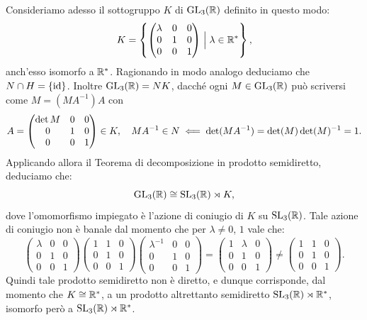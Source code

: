 \documentclass[11pt]{scrartcl}
\begin{document}
	Consideriamo adesso il sottogruppo $K$ di $\operatorname{GL}_3(\mathbb R)$ definito in questo modo:
	\[
	K = \left\{\begin{pmatrix}
		\lambda & 0 & 0\\
		0 & 1 & 0\\
		0 & 0 & 1
	\end{pmatrix}\Bigm| \lambda \in \mathbb R^* \right\},
	\]
	anch'esso isomorfo a $\mathbb R^*$. Ragionando in modo analogo deduciamo che $N \cap H = \{\mathrm{id}\}$. 
	Inoltre $\operatorname{GL}_3(\mathbb R) = NK$, dacché ogni $M \in \operatorname{GL}_3(\mathbb R)$ può scriversi come
	$M = (MA^{-1})A$ con 
	\[
	A = \begin{pmatrix}
		\det M & 0 & 0\\
		0 & 1 & 0\\
		0 & 0 & 1
	\end{pmatrix} \in K, \quad MA^{-1} \in N \impliedby \det(MA^{-1}) = \det(M) \det(M)^{-1} = 1.
	\]
	Applicando allora il Teorema di decomposizione in prodotto semidiretto, deduciamo
	che: 
	\[
	\operatorname{GL}_3(\mathbb R) \cong \operatorname{SL}_3(\mathbb R) \rtimes K,
	\]
	dove l'omomorfismo impiegato è l'azione di coniugio di $K$ su $\operatorname{SL}_3(\mathbb R)$.
	Tale azione di coniugio non è banale dal momento che per $\lambda \neq 0$, $1$ vale che:
	\[
	\begin{pmatrix}
		\lambda & 0 & 0\\
		0 & 1 & 0\\
		0 & 0 & 1
	\end{pmatrix}
	\begin{pmatrix}
		1 & 1 & 0\\
		0 & 1 & 0\\
		0 & 0 & 1
	\end{pmatrix}
	\begin{pmatrix}
		\lambda^{-1}& 0 & 0\\
		0 & 1 & 0\\
		0 & 0 & 1
	\end{pmatrix} = 
	\begin{pmatrix}
		1 & \lambda & 0\\
		0 & 1 & 0\\
		0 & 0 & 1
	\end{pmatrix} \neq \begin{pmatrix}
		1 & 1 & 0\\
		0 & 1 & 0\\
		0 & 0 & 1
	\end{pmatrix}.
	\]
	Quindi tale prodotto semidiretto non è diretto, e dunque corrisponde,
	dal momento che $K \cong \mathbb R^*$, a un prodotto altrettanto semidiretto
	$\operatorname{SL}_3(\mathbb R) \rtimes \mathbb R^*$, isomorfo però a $\operatorname{SL}_3(\mathbb R) \rtimes \mathbb R^*$. \medskip
	
\end{document}
